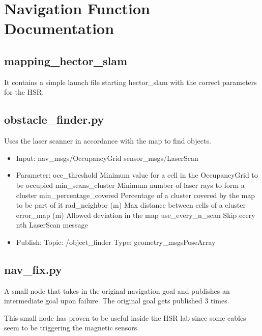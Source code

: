 \documentclass[main.tex]{subfiles}
\begin{document}
	\begingroup

	\renewcommand{\cleardoublepage}{}

	\renewcommand{\clearpage}{}

	\chapter{Navigation Function Documentation}

		
		\section{mapping\_hector\_slam}
		It contains a simple launch file starting hector\_slam with the correct parameters for the HSR.
		
		\section{obstacle\_finder.py}
		Uses the laser scanner in accordance with the map to find objects.
		
		\begin{itemize}
			\item Input: 
				\subitem nav\_msgs/OccupancyGrid
				\subitem sensor\_msgs/LaserScan
			\item Parameter:
				\subitem occ\_threshold 
				Minimum value for a cell in the OccupancyGrid to be occupied
				\subitem min\_scans\_cluster
				Minimum number of laser rays to form a cluster
				\subitem min\_percentage\_covered
				Percentage of a cluster covered by the map to be part of it
				\subitem rad\_neighbor (m)
				Max distance between cells of a cluster
				\subitem error\_map (m)
				Allowed deviation in the map
				\subitem use\_every\_n\_scan
				Skip ecery nth LaserScan message 
			\item  Publish:
				\subitem Topic: /object\_finder
				\subitem Type: geometry\_msgsPoseArray
		\end{itemize}
		
		\section{nav\_fix.py}
		A small node that takes in the original navigation goal and publishes an intermediate goal upon failure. The original goal gets published 3 times.
		
		This small node has proven to be useful inside the HSR lab since some cables seem to be triggering the magnetic sensors.

	\endgroup
\end{document}
